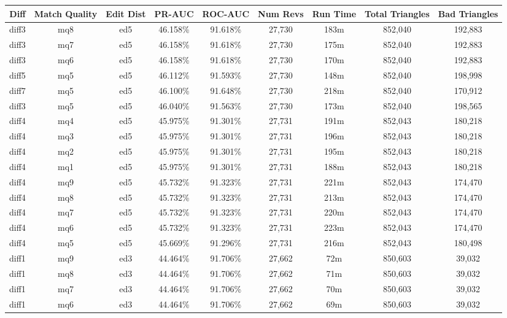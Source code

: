 \begin{sidewaystable}[!ph]
  \begin{center}
    \begin{tabular}{|c|c|c||c|c||c|c|c|c|}
\hline
Diff & Match Quality & Edit Dist
        & PR-AUC & ROC-AUC
        & Num Revs & Run Time
        & Total Triangles & Bad Triangles \\
\hline
\hline
diff3 & mq8 & ed5 & 46.158\% & 91.618\% & 27,730 & 183m & 852,040 & 192,883 \\
diff3 & mq7 & ed5 & 46.158\% & 91.618\% & 27,730 & 175m & 852,040 & 192,883 \\
diff3 & mq6 & ed5 & 46.158\% & 91.618\% & 27,730 & 170m & 852,040 & 192,883 \\
diff5 & mq5 & ed5 & 46.112\% & 91.593\% & 27,730 & 148m & 852,040 & 198,998 \\
diff7 & mq5 & ed5 & 46.100\% & 91.648\% & 27,730 & 218m & 852,040 & 170,912 \\
diff3 & mq5 & ed5 & 46.040\% & 91.563\% & 27,730 & 173m & 852,040 & 198,565 \\
diff4 & mq4 & ed5 & 45.975\% & 91.301\% & 27,731 & 191m & 852,043 & 180,218 \\
diff4 & mq3 & ed5 & 45.975\% & 91.301\% & 27,731 & 196m & 852,043 & 180,218 \\
diff4 & mq2 & ed5 & 45.975\% & 91.301\% & 27,731 & 195m & 852,043 & 180,218 \\
diff4 & mq1 & ed5 & 45.975\% & 91.301\% & 27,731 & 188m & 852,043 & 180,218 \\
diff4 & mq9 & ed5 & 45.732\% & 91.323\% & 27,731 & 221m & 852,043 & 174,470 \\
diff4 & mq8 & ed5 & 45.732\% & 91.323\% & 27,731 & 213m & 852,043 & 174,470 \\
diff4 & mq7 & ed5 & 45.732\% & 91.323\% & 27,731 & 220m & 852,043 & 174,470 \\
diff4 & mq6 & ed5 & 45.732\% & 91.323\% & 27,731 & 223m & 852,043 & 174,470 \\
diff4 & mq5 & ed5 & 45.669\% & 91.296\% & 27,731 & 216m & 852,043 & 180,498 \\
diff1 & mq9 & ed3 & 44.464\% & 91.706\% & 27,662 & 72m & 850,603 & 39,032 \\
diff1 & mq8 & ed3 & 44.464\% & 91.706\% & 27,662 & 71m & 850,603 & 39,032 \\
diff1 & mq7 & ed3 & 44.464\% & 91.706\% & 27,662 & 70m & 850,603 & 39,032 \\
diff1 & mq6 & ed3 & 44.464\% & 91.706\% & 27,662 & 69m & 850,603 & 39,032 \\

\end{tabular}
\end{center}
\end{sidewaystable}
